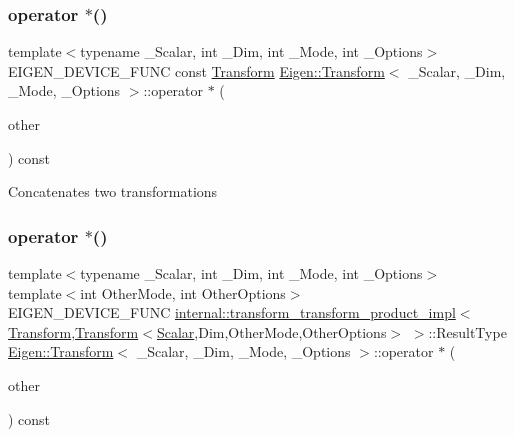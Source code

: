 \subsubsection{\texorpdfstring{operator $\ast$()}{operator *()}\hspace{0.1cm}{\footnotesize\ttfamily [3/4]}}
{\footnotesize\ttfamily template$<$typename \+\_\+\+Scalar, int \+\_\+\+Dim, int \+\_\+\+Mode, int \+\_\+\+Options$>$ \\
E\+I\+G\+E\+N\+\_\+\+D\+E\+V\+I\+C\+E\+\_\+\+F\+U\+NC const \mbox{\hyperlink{class_eigen_1_1_transform}{Transform}} \mbox{\hyperlink{class_eigen_1_1_transform}{Eigen\+::\+Transform}}$<$ \+\_\+\+Scalar, \+\_\+\+Dim, \+\_\+\+Mode, \+\_\+\+Options $>$\+::operator $\ast$ (\begin{DoxyParamCaption}\item[{const \mbox{\hyperlink{class_eigen_1_1_transform}{Transform}}$<$ \+\_\+\+Scalar, \+\_\+\+Dim, \+\_\+\+Mode, \+\_\+\+Options $>$ \&}]{other }\end{DoxyParamCaption}) const\hspace{0.3cm}{\ttfamily [inline]}}

Concatenates two transformations \mbox{\label{class_eigen_1_1_transform_ad03b12c8d84f5f0a408d1105ce880efd}} 
\subsubsection{\texorpdfstring{operator $\ast$()}{operator *()}\hspace{0.1cm}{\footnotesize\ttfamily [4/4]}}
{\footnotesize\ttfamily template$<$typename \+\_\+\+Scalar, int \+\_\+\+Dim, int \+\_\+\+Mode, int \+\_\+\+Options$>$ \\
template$<$int Other\+Mode, int Other\+Options$>$ \\
E\+I\+G\+E\+N\+\_\+\+D\+E\+V\+I\+C\+E\+\_\+\+F\+U\+NC \mbox{\hyperlink{struct_eigen_1_1internal_1_1transform__transform__product__impl}{internal\+::transform\+\_\+transform\+\_\+product\+\_\+impl}}$<$\mbox{\hyperlink{class_eigen_1_1_transform}{Transform}},\mbox{\hyperlink{class_eigen_1_1_transform}{Transform}}$<$\mbox{\hyperlink{class_eigen_1_1_transform_a4e69ced9d651745b8ed4eda46f41795d}{Scalar}},Dim,Other\+Mode,Other\+Options$>$ $>$\+::Result\+Type \mbox{\hyperlink{class_eigen_1_1_transform}{Eigen\+::\+Transform}}$<$ \+\_\+\+Scalar, \+\_\+\+Dim, \+\_\+\+Mode, \+\_\+\+Options $>$\+::operator $\ast$ (\begin{DoxyParamCaption}\item[{const \mbox{\hyperlink{class_eigen_1_1_transform}{Transform}}$<$ \mbox{\hyperlink{class_eigen_1_1_transform_a4e69ced9d651745b8ed4eda46f41795d}{Scalar}}, Dim, Other\+Mode, Other\+Options $>$ \&}]{other }\end{DoxyParamCaption}) const\hspace{0.3cm}{\ttfamily [inline]}}

